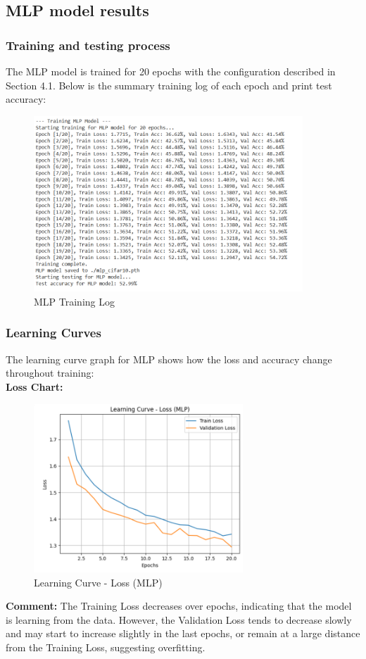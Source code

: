 \documentclass[12pt]{article}
\begin{document}
\subsection{MLP model results}
\subsubsection{Training and testing process}
The MLP model is trained for 20 epochs with the configuration described in Section 4.1. Below is the summary training log of each epoch and print test accuracy:
\begin{figure}[H]
    \centering
    \includegraphics[width=0.9\textwidth]{Screenshots/Ảnh chụp màn hình 2025-05-23 222816.png} %
    \caption{MLP Training Log}
    \label{fig:mlp_training_log}
\end{figure}

\subsubsection{Learning Curves}
The learning curve graph for MLP shows how the loss and accuracy change throughout training: \\
\textbf{Loss Chart:}
\begin{figure}[H]
    \centering
    \includegraphics[width=0.7\textwidth]{Screenshots/Ảnh chụp màn hình 2025-05-23 222935.png} %
    \caption{Learning Curve - Loss (MLP)}
    \label{fig:mlp_loss_chart}
\end{figure}
\textbf{Comment:} The Training Loss decreases over epochs, indicating that the model is learning from the data. However, the Validation Loss tends to decrease slowly and may start to increase slightly in the last epochs, or remain at a large distance from the Training Loss, suggesting overfitting.
\end{document}
